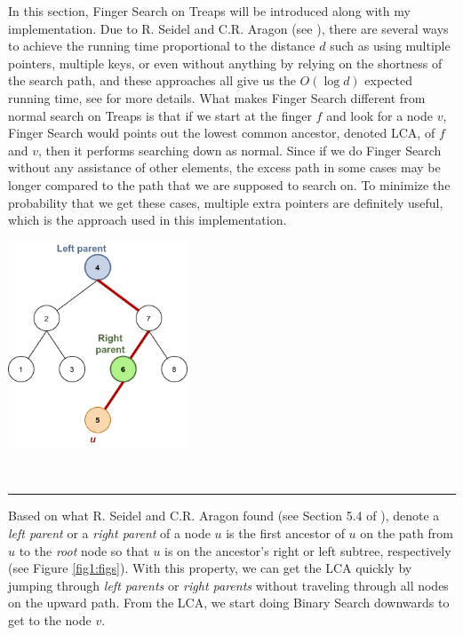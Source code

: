 \documentclass[12pt,english,]{article}
\let\origfigure\figure
\let\endorigfigure\endfigure
\renewenvironment{figure}[1][2] {
    \expandafter\origfigure\expandafter[H]
} {
    \endorigfigure
}
\begin{document}
In this section, Finger Search on Treaps will be introduced along with
my implementation. Due to R. Seidel and C.R. Aragon (see \cite{1}),
there are several ways to achieve the running time proportional to the
distance \(d\) such as using multiple pointers, multiple keys, or even
without anything by relying on the shortness of the search path, and
these approaches all give us the \(O(\log d)\) expected running time,
see \cite{1} for more details. What makes Finger Search different from
normal search on Treaps is that if we start at the finger \(f\) and look
for a node \(v\), Finger Search would points out the lowest common
ancestor, denoted LCA, of \(f\) and \(v\), then it performs searching
down as normal. Since if we do Finger Search without any assistance of
other elements, the excess path in some cases may be longer compared to
the path that we are supposed to search on. To minimize the probability
that we get these cases, multiple extra pointers are definitely useful,
which is the approach used in this implementation.

\begin{figure}
\centering
\vspace{1mm}
\includegraphics[width=0.4\textwidth]{tree.png}
\caption{\label{fig1:figs}Visualization of \textit{left parent} and \textit{right parent} of a node $u$ in a binary tree.}

\  
\hrule
\end{figure}

Based on what R. Seidel and C.R. Aragon found (see Section 5.4 of
\cite{1}), denote a \emph{left parent} or a \emph{right parent} of a
node \(u\) is the first ancestor of \(u\) on the path from \(u\) to the
\emph{root} node so that \(u\) is on the ancestor's right or left
subtree, respectively (see Figure \ref{fig1:figs}). With this property,
we can get the LCA quickly by jumping through \emph{left parents} or
\emph{right parents} without traveling through all nodes on the upward
path. From the LCA, we start doing Binary Search downwards to get to the
node \(v\).
\end{document}
